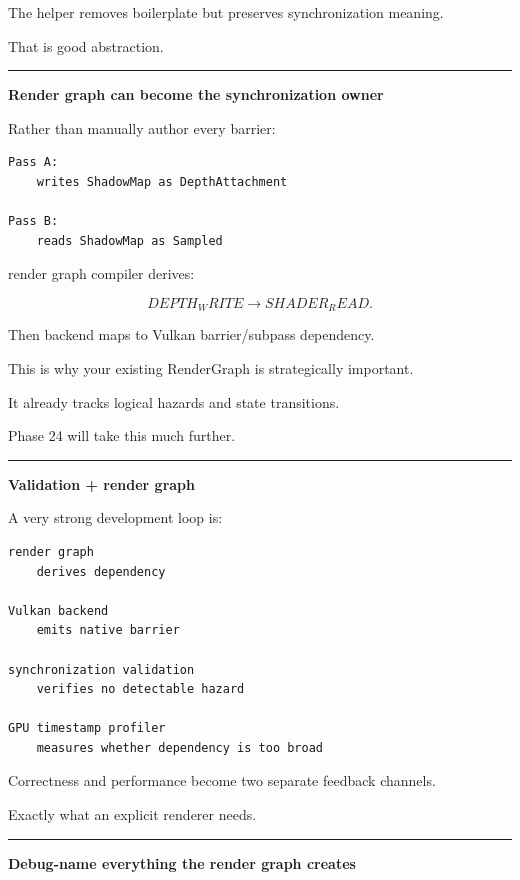 The helper removes boilerplate but preserves synchronization meaning.

That is good abstraction.

\begin{center}\rule{0.5\linewidth}{0.5pt}\end{center}

\textbf{Render graph can become the synchronization owner}

Rather than manually author every barrier:

\begin{verbatim}
Pass A:
    writes ShadowMap as DepthAttachment

Pass B:
    reads ShadowMap as Sampled
\end{verbatim}

render graph compiler derives:

\[
DEPTH_WRITE
\rightarrow
SHADER_READ.
\]

Then backend maps to Vulkan barrier/subpass dependency.

This is why your existing RenderGraph is strategically important.

It already tracks logical hazards and state transitions.

Phase 24 will take this much further.

\begin{center}\rule{0.5\linewidth}{0.5pt}\end{center}

\textbf{Validation + render graph}

A very strong development loop is:

\begin{verbatim}
render graph
    derives dependency

Vulkan backend
    emits native barrier

synchronization validation
    verifies no detectable hazard

GPU timestamp profiler
    measures whether dependency is too broad
\end{verbatim}

Correctness and performance become two separate feedback channels.

Exactly what an explicit renderer needs.

\begin{center}\rule{0.5\linewidth}{0.5pt}\end{center}

\textbf{Debug-name everything the render graph creates}

